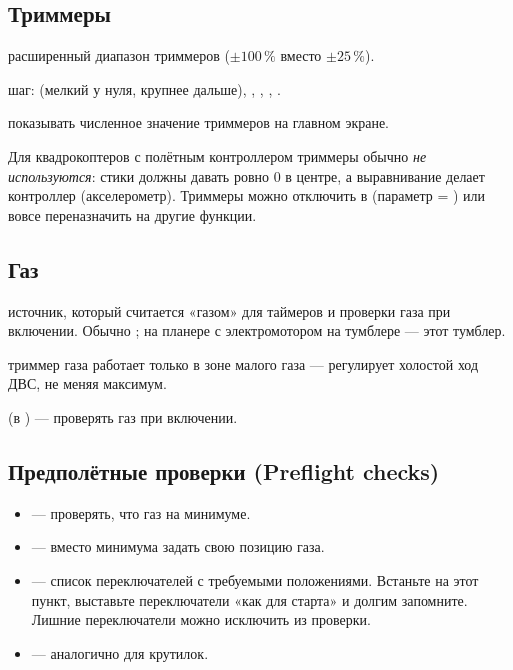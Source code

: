 \subsection{Триммеры}

\begin{description}[font=\sffamily\bfseries\color{etx}]
  \item[Extended trims] расширенный диапазон триммеров ($\pm100\,\%$ вместо $\pm25\,\%$).
  \item[Trim step] шаг:  (мелкий у нуля, крупнее дальше), ,
        , , .
  \item[Display trims] показывать численное значение триммеров на главном экране.
\end{description}

Для квадрокоптеров с полётным контроллером триммеры обычно \emph{не используются}: стики
должны давать ровно 0 в центре, а выравнивание делает контроллер (акселерометр). Триммеры
можно отключить в  (параметр  = ) или вовсе переназначить
на другие функции.

\subsection{Газ}

\begin{description}[font=\sffamily\bfseries\color{etx}]
  \item[Throttle source] источник, который считается «газом» для таймеров и проверки газа
        при включении. Обычно ; на планере с электромотором на тумблере ---
        этот тумблер.
  \item[Throttle trim idle only] триммер газа работает только в зоне малого газа ---
        регулирует холостой ход ДВС, не меняя максимум.
  \item[Throttle warning] (в ) --- проверять газ при включении.
\end{description}

\subsection{Предполётные проверки (Preflight checks)}

\begin{itemize}
  \item {} --- проверять, что газ на минимуме.
  \item {} --- вместо минимума задать свою позицию газа.
  \item {} --- список переключателей с требуемыми положениями.
        Встаньте на этот пункт, выставьте переключатели «как для старта» и долгим 
        запомните. Лишние переключатели можно исключить из проверки.
  \item {} --- аналогично для крутилок.
\end{itemize}

